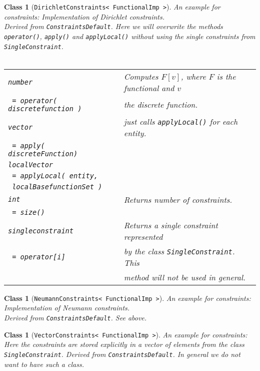 \documentclass[a4paper,11pt]{article}
\numberwithin{equation}{section}
\newtheorem{class}[definition]{Class}
\newcommand{\theoremEndLine}{\hspace{1mm}}
\newcommand{\CodeT}[1]{\textnormal{\texttt{#1}}}
\begin{document}
	\begin{class}[\CodeT{DirichletConstraints< FunctionalImp >}]
		An example for constraints: Implementation of Dirichlet constraints.\\
		Derived from \CodeT{ConstraintsDefault}. Here we will \emph{overwrite} the methods \CodeT{operator()}, \CodeT{apply()} and \CodeT{applyLocal()} without using the single constraints from \CodeT{SingleConstraint}.\\\\
		\begin{tabular}{|l|l|}
			\hline
			\CodeT{number} & Computes $F[v]$, where $F$ is the functional and $v$\\
			\CodeT{ = operator( discretefunction )} & the discrete function.\\
			\hline
			\CodeT{vector} & just calls \CodeT{applyLocal()} for each entity.\\
			\CodeT{ = apply( discreteFunction) } & \\
			\hline
			\CodeT{localVector} & \\
			\CodeT{ = applyLocal( entity,} & \\
			\CodeT{ localBasefunctionSet )}  & \\
			\hline
			\CodeT{int} & Returns number of constraints. \\
			\CodeT{ = size()} & \\
			\hline
			\CodeT{singleconstraint} & Returns a single constraint represented\\
			\CodeT{ = operator[i]} & by the class \CodeT{SingleConstraint}. This \\
				& method will not be used in general.\\
			\hline
		\end{tabular}
  \end{class}\theoremEndLine

	\begin{class}[\CodeT{NeumannConstraints< FunctionalImp >}]
		An example for constraints: Implementation of Neumann constraints.\\
		Derived from \CodeT{ConstraintsDefault}. See above.
  \end{class}\theoremEndLine

	\begin{class}[\CodeT{VectorConstraints< FunctionalImp >}]
		An example for constraints: Here the constraints are stored explicitly in a vector of elements from the class \CodeT{SingleConstraint}. Derived from \CodeT{ConstraintsDefault}. \emph{In general we do not want to have such a class}.
  \end{class}\theoremEndLine




  
  
\end{document}
